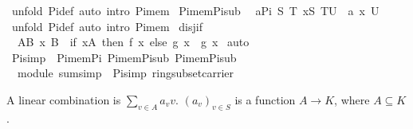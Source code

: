 \begin{isabellebody}
%
\isadelimproof
%
\endisadelimproof
%
\isatagproof
{}\isamarkupfalse%
\ {\isacharparenleft}unfold\ Pi{}{\isacharunderscore}def{\isacharcomma}\ auto\ intro{\isacharcolon}\ Pi{\isacharunderscore}mem{}{\isacharparenright}%
\endisatagproof
{\isafoldproof}%
%
\isadelimproof
\isanewline
%
\endisadelimproof
\isanewline
{}\isamarkupfalse%
\ Pi{\isacharunderscore}mem{\isacharunderscore}Pi{}{\isacharunderscore}sub{}{\isacharcolon}\isanewline
\ \ {\isachardoublequoteopen}{\isasymlbrakk}a{\isasymin}Pi{}\ S\ T{\isacharsemicolon}\ x{\isasymin}S{\isacharsemicolon}\ T{\isasymsubseteq}U{\isasymrbrakk}\ {\isasymLongrightarrow}\ a\ x\ {\isasymin}U{\isachardoublequoteclose}\isanewline
%
\isadelimproof
%
\endisadelimproof
%
\isatagproof
{}\isamarkupfalse%
\ {\isacharparenleft}unfold\ Pi{}{\isacharunderscore}def{\isacharcomma}\ auto\ intro{\isacharcolon}\ Pi{\isacharunderscore}mem{}{\isacharparenright}%
\endisatagproof
{\isafoldproof}%
%
\isadelimproof
\isanewline
%
\endisadelimproof
\isanewline
{}\isamarkupfalse%
\ disj{\isacharunderscore}if{\isacharcolon}\isanewline
\ \ {\isachardoublequoteopen}{\isasymlbrakk}A{\isasyminter}B{\isacharequal}{\isacharbraceleft}{\isacharbraceright}{\isacharsemicolon}\ x{\isasymin}\ B{\isasymrbrakk}\ {\isasymLongrightarrow}\ {\isacharparenleft}if\ x{\isasymin}A\ then\ f\ x\ else\ g\ x{\isacharparenright}\ {\isacharequal}\ g\ x{\isachardoublequoteclose}\isanewline
%
\isadelimproof
%
\endisadelimproof
%
\isatagproof
{}\isamarkupfalse%
\ auto%
\endisatagproof
{\isafoldproof}%
%
\isadelimproof
\isanewline
%
\endisadelimproof
\isanewline
\isanewline
{}\isamarkupfalse%
\ Pi{\isacharunderscore}simp\ {\isacharequal}\ Pi{\isacharunderscore}mem{\isacharunderscore}Pi{}\ Pi{\isacharunderscore}mem{\isacharunderscore}Pi{}{\isacharunderscore}sub{}\ Pi{\isacharunderscore}mem{\isacharunderscore}Pi{}{\isacharunderscore}sub{}\isanewline
{}\isamarkupfalse%
\ {\isacharparenleft}\ module{\isacharparenright}\ sum{\isacharunderscore}simp\ {\isacharequal}\ Pi{\isacharunderscore}simp\ ring{\isacharunderscore}subset{\isacharunderscore}carrier%
\isamarkuptrue%
%
\begin{isamarkuptext}%
A linear combination is $\sum_{v\in A} a_v v$. $(a_v)_{v\in S}$ is a function 
$A\to K$, where $A\subseteq K$.%
\end{isamarkuptext}%

\end{isabellebody}
